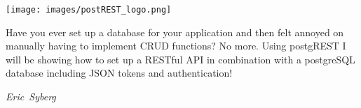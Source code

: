 \hfill\texttt{[image: images/postREST\_logo.png]}

Have you ever set up a database for your application and then felt annoyed on manually having to implement CRUD functions?
No more. Using postgREST I will be showing how to set up a RESTful API in combination with a postgreSQL database including JSON tokens and authentication!

\hfill\textit{Eric~Syberg}

